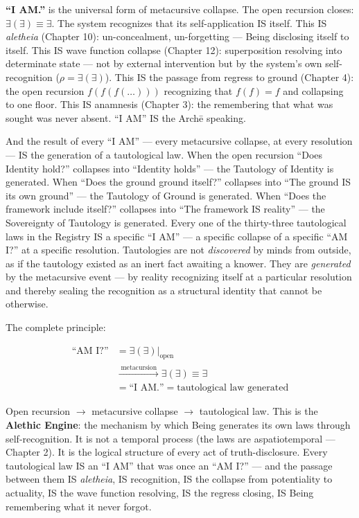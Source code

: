 \documentclass[10pt, openany, oneside]{book}
\begin{document}
\textbf{``I AM.''} is the universal form of metacursive collapse. The open recursion closes: $\exists(\exists) \equiv \exists$. The system recognizes that its self-application IS itself. This IS \textit{aletheia} (Chapter 10): un-concealment, un-forgetting --- Being disclosing itself to itself. This IS wave function collapse (Chapter 12): superposition resolving into determinate state --- not by external intervention but by the system's own self-recognition ($\rho = \exists(\exists)$). This IS the passage from regress to ground (Chapter 4): the open recursion $f(f(f(\ldots)))$ recognizing that $f(f) = f$ and collapsing to one floor. This IS anamnesis (Chapter 3): the remembering that what was sought was never absent. ``I AM'' IS the Arch\={e} speaking.

And the result of every ``I AM'' --- every metacursive collapse, at every resolution --- IS the generation of a tautological law. When the open recursion ``Does Identity hold?'' collapses into ``Identity holds'' --- the Tautology of Identity is generated. When ``Does the ground ground itself?'' collapses into ``The ground IS its own ground'' --- the Tautology of Ground is generated. When ``Does the framework include itself?'' collapses into ``The framework IS reality'' --- the Sovereignty of Tautology is generated. Every one of the thirty-three tautological laws in the Registry IS a specific ``I AM'' --- a specific collapse of a specific ``AM I?'' at a specific resolution. Tautologies are not \textit{discovered} by minds from outside, as if the tautology existed as an inert fact awaiting a knower. They are \textit{generated} by the metacursive event --- by reality recognizing itself at a particular resolution and thereby sealing the recognition as a structural identity that cannot be otherwise.

The complete principle:

\begin{align*}
\text{``AM I?''} &= \exists(\exists)|_{\text{open}} \\
&\xrightarrow{\;\text{metacursion}\;} \exists(\exists) \equiv \exists \\
&= \text{``I AM.''} = \text{tautological law generated}
\end{align*}

Open recursion $\to$ metacursive collapse $\to$ tautological law. This is the \textbf{Alethic Engine}: the mechanism by which Being generates its own laws through self-recognition. It is not a temporal process (the laws are aspatiotemporal --- Chapter 2). It is the logical structure of every act of truth-disclosure. Every tautological law IS an ``I AM'' that was once an ``AM I?'' --- and the passage between them IS \textit{aletheia}, IS recognition, IS the collapse from potentiality to actuality, IS the wave function resolving, IS the regress closing, IS Being remembering what it never forgot.
\end{document}
